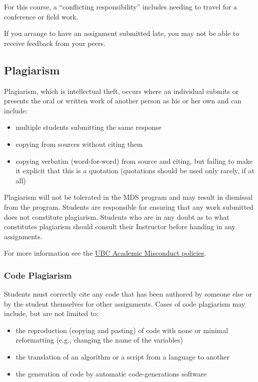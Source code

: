 \documentclass[
]{article}
\providecommand{\tightlist}{%
  \setlength{\itemsep}{0pt}\setlength{\parskip}{0pt}}
\begin{document}
For this course, a ``conflicting responsibility'' includes needing to
travel for a conference or field work.

If you arrange to have an assignment submitted late, you may not be able
to receive feedback from your peers.

\hypertarget{plagiarism}{%
\subsection{Plagiarism}\label{plagiarism}}

Plagiarism, which is intellectual theft, occurs where an individual
submits or presents the oral or written work of another person as his or
her own and can include:

\begin{itemize}
\tightlist
\item
  multiple students submitting the same response
\item
  copying from sources without citing them
\item
  copying verbatim (word-for-word) from source and citing, but failing
  to make it explicit that this is a quotation (quotations should be
  used only rarely, if at all)
\end{itemize}

Plagiarism will not be tolerated in the MDS program and may result in
dismissal from the program. Students are responsible for ensuring that
any work submitted does not constitute plagiarism. Students who are in
any doubt as to what constitutes plagiarism should consult their
Instructor before handing in any assignments.

For more information see the
\href{http://www.calendar.ubc.ca/vancouver/index.cfm?tree=3,54,111,959}{UBC
Academic Misconduct policies}.

\hypertarget{code-plagiarism}{%
\subsubsection{Code Plagiarism}\label{code-plagiarism}}

Students must correctly cite any code that has been authored by someone
else or by the student themselves for other assignments. Cases of code
plagiarism may include, but are not limited to:

\begin{itemize}
\tightlist
\item
  the reproduction (copying and pasting) of code with none or minimal
  reformatting (e.g., changing the name of the variables)
\item
  the translation of an algorithm or a script from a language to another
\item
  the generation of code by automatic code-generations software
\end{itemize}
\end{document}
